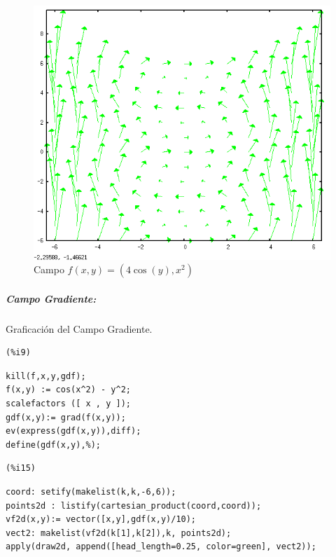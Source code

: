 \documentclass[12pt]{article}
\begin{document}
\begin{figure}[H]
\centering
\includegraphics[scale=0.5]{9.png}
\caption{Campo  $f(x,y)= (4\cos(y),x^2)$ }
\end{figure}


\subparagraph{Campo Gradiente:}
Graficación del Campo Gradiente.

\noindent
\begin{minipage}[t]{8ex}{\color{red}\bf
\begin{verbatim}
(%i9) 
\end{verbatim}}
\end{minipage}
\begin{minipage}[t]{\textwidth}{\color{blue}
\begin{verbatim}
kill(f,x,y,gdf);
f(x,y) := cos(x^2) - y^2;
scalefactors ([ x , y ]);
gdf(x,y):= grad(f(x,y));
ev(express(gdf(x,y)),diff);
define(gdf(x,y),%);
\end{verbatim}}
\end{minipage}

\noindent
\begin{minipage}[t]{8ex}{\color{red}\bf
\begin{verbatim}
(%i15) 
\end{verbatim}}
\end{minipage}
\begin{minipage}[t]{\textwidth}{\color{blue}
\begin{verbatim}
coord: setify(makelist(k,k,-6,6));
points2d : listify(cartesian_product(coord,coord));
vf2d(x,y):= vector([x,y],gdf(x,y)/10);
vect2: makelist(vf2d(k[1],k[2]),k, points2d);
apply(draw2d, append([head_length=0.25, color=green], vect2));
\end{verbatim}}
\end{minipage}
\end{document}
